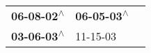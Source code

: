 \begin{supertabular}{lll}
 \textbf{06-08-02\textsuperscript{$\wedge$}} &  \textbf{06-05-03\textsuperscript{$\wedge$}} \\
 \textbf{03-06-03\textsuperscript{$\wedge$}} &                   11-15-03\textsuperscript{} \\
\end{supertabular}
